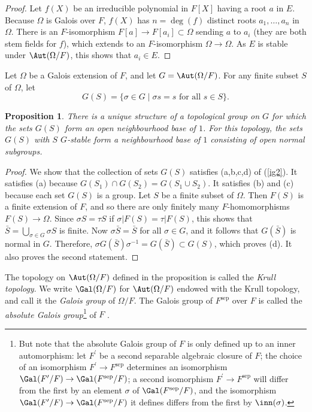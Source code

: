 \documentclass[a4paper,11pt,final,openany]{memoir}
\newtheorem{proposition}[X]{Proposition}
\theoremstyle{nonumberplain}
\newtheorem{proof}{Proof.}
\begin{document}
\begin{proof}
Let $f(X)$ be an irreducible polynomial in $F[X]$ having a root $a$ in $E$.
Because $\Omega$ is Galois over $F$, $f(X)$ has $n=\deg(f)$ distinct roots
$a_{1},\ldots,a_{n}$ in $\Omega$. There is an $F$-isomorphism $F[a]\rightarrow
F[a_{i}]\subset\Omega$ sending $a$ to $a_{i}$ (they are both stem fields for
$f$), which extends to an $F$-isomorphism $\Omega\rightarrow\Omega$. As $E$ is
stable under $\Aut(\Omega/F)$, this shows that $a_{i}\in E$.
\end{proof}

Let $\Omega$ be a Galois extension of $F$, and let $G=\Aut(\Omega/F)$. For any
finite subset $S$ of $\Omega$, let%
\[
G(S)=\{\sigma\in G\mid\sigma s=s\text{ for all }s\in S\}.
\]


\begin{proposition}
\label{ig3}There is a unique structure of a topological group on $G$ for which
the sets $G(S)$ form an open neighbourhood base of $1$. For this topology, the
sets $G(S)$ with $S$ $G$-stable form a neighbourhood base of $1$ consisting of
open normal subgroups.
\end{proposition}

\begin{proof}
We show that the collection of sets $G(S)$ satisfies (a,b,c,d) of (\ref{ig2}).
It satisfies (a) because $G(S_{1})\cap G(S_{2})=G(S_{1}\cup S_{2})$. It
satisfies (b) and (c) because each set $G(S)$ is a group. Let $S$ be a finite
subset of $\Omega$. Then $F(S)$ is a finite extension of $F$, and so there are
only finitely many $F$-homomorphisms $F(S)\rightarrow\Omega$. Since $\sigma
S=\tau S$ if $\sigma|F(S)=\tau|F(S)$, this shows that $\bar{S}=\bigcup
\nolimits_{\sigma\in G}\sigma S$ is finite. Now $\sigma\bar{S}=\bar{S}$ for
all $\sigma\in G$, and it follows that $G(\bar{S})$ is normal in $G$.
Therefore, $\sigma G(\bar{S})\sigma^{-1}=G(\bar{S})\subset G(S)$, which proves
(d). It also proves the second statement.
\end{proof}

The topology on $\Aut(\Omega/F)$ defined in the proposition is called the%
\emph{Krull topology}. We write $\Gal(\Omega/F)$ for $\Aut(\Omega/F)$ endowed
with the Krull topology, and call it the%
\emph{Galois group} of $\Omega/F$. The Galois group of $F^{\mathrm{sep}}$ over
$F$ is called the \emph{absolute Galois group}\footnote{But note that the
absolute Galois group of $F$ is only defined up to an inner automorphism: let
$F^{\prime}$ be a second separable algebraic closure of $F$; the choice of an
isomorphism $F^{\prime}\rightarrow F^{\mathrm{sep}}$ determines an isomorphism
$\Gal(F^{\prime}/F)\rightarrow\Gal(F^{\mathrm{sep}}/F)$; a second isomorphism
$F^{\prime}\rightarrow F^{\mathrm{sep}}$ will differ from the first by an
element $\sigma$ of $\Gal(F^{\mathrm{sep}}/F)$, and the isomorphism
$\Gal(F^{\prime}/F)\rightarrow\Gal(F^{\mathrm{sep}}/F)$ it defines differs
from the first by $\inn(\sigma)$.} of $F$%
%
.
\end{document}
